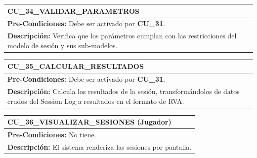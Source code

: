 \begin{center}
  \begin{tabular}{| p{7.5cm} | p{7.5cm} |}
    \hline
    \multicolumn{2}{|p{15cm}|}{\textbf{CU\_34\_VALIDAR\_PARAMETROS}} \\ \hline
    \multicolumn{2}{|p{15cm}|}{\textbf{Pre-Condiciones:} Debe ser activado por \textbf{CU\_31}.} \\ \hline
    \multicolumn{2}{|p{15cm}|}{\textbf{Descripción:} Verifica que los parámetros cumplan con las restricciones del modelo de sesión y sus sub-modelos.} \\
    \hline
  \end{tabular}
\end{center}

\begin{center}
  \begin{tabular}{| p{7.5cm} | p{7.5cm} |}
    \hline
    \multicolumn{2}{|p{15cm}|}{\textbf{CU\_35\_CALCULAR\_RESULTADOS}} \\ \hline
    \multicolumn{2}{|p{15cm}|}{\textbf{Pre-Condiciones:} Debe ser activado por \textbf{CU\_31}.} \\ \hline
    \multicolumn{2}{|p{15cm}|}{\textbf{Descripción:} Calcula los resultados de la sesión, transformándolos de datos crudos del Session Log a resultados en el formato de RVA.} \\
    \hline
  \end{tabular}
\end{center}

\begin{center}
  \begin{tabular}{| p{7.5cm} | p{7.5cm} |}
    \hline
    \multicolumn{2}{|p{15cm}|}{\textbf{CU\_36\_VISUALIZAR\_SESIONES} (Jugador)} \\ \hline
    \multicolumn{2}{|p{15cm}|}{\textbf{Pre-Condiciones:} No tiene.} \\ \hline
    \multicolumn{2}{|p{15cm}|}{\textbf{Descripción:} El sistema renderiza las sesiones por pantalla.} \\
    \hline
  \end{tabular}
\end{center}

